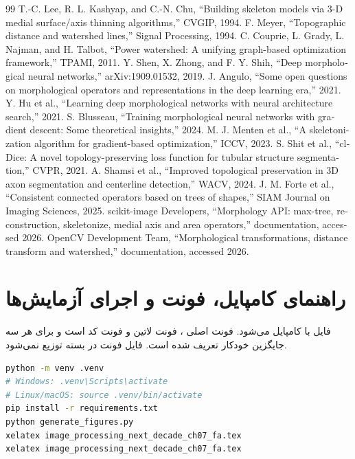 \documentclass[12pt,openany,oneside]{book}
\begin{document}
\begin{latin}
\begin{thebibliography}{99}
 T.-C. Lee, R. L. Kashyap, and C.-N. Chu, ``Building skeleton models via 3-D medial surface/axis thinning algorithms,'' CVGIP, 1994.
 F. Meyer, ``Topographic distance and watershed lines,'' Signal Processing, 1994.
 C. Couprie, L. Grady, L. Najman, and H. Talbot, ``Power watershed: A unifying graph-based optimization framework,'' TPAMI, 2011.
 Y. Shen, X. Zhong, and F. Y. Shih, ``Deep morphological neural networks,'' arXiv:1909.01532, 2019.
 J. Angulo, ``Some open questions on morphological operators and representations in the deep learning era,'' 2021.
 Y. Hu et al., ``Learning deep morphological networks with neural architecture search,'' 2021.
 S. Blusseau, ``Training morphological neural networks with gradient descent: Some theoretical insights,'' 2024.
 M. J. Menten et al., ``A skeletonization algorithm for gradient-based optimization,'' ICCV, 2023.
 S. Shit et al., ``clDice: A novel topology-preserving loss function for tubular structure segmentation,'' CVPR, 2021.
 A. Shamsi et al., ``Improved topological preservation in 3D axon segmentation and centerline detection,'' WACV, 2024.
 J. M. Forte et al., ``Consistent connected operators based on trees of shapes,'' SIAM Journal on Imaging Sciences, 2025.
 scikit-image Developers, ``Morphology API: max-tree, reconstruction, skeletonize, medial axis and area operators,'' documentation, accessed 2026.
 OpenCV Development Team, ``Morphological transformations, distance transform and watershed,'' documentation, accessed 2026.
\end{thebibliography}
\end{latin}

\chapter*{راهنمای کامپایل، فونت و اجرای آزمایش‌ها}
فایل با  کامپایل می‌شود. فونت اصلی ، فونت لاتین  و فونت کد
 است و برای هر سه جایگزین خودکار تعریف شده است. فایل فونت در بسته توزیع نمی‌شود.

\begin{latin}
\begin{lstlisting}[language=bash]
python -m venv .venv
# Windows: .venv\Scripts\activate
# Linux/macOS: source .venv/bin/activate
pip install -r requirements.txt
python generate_figures.py
xelatex image_processing_next_decade_ch07_fa.tex
xelatex image_processing_next_decade_ch07_fa.tex
\end{lstlisting}
\end{latin}
\end{document}
